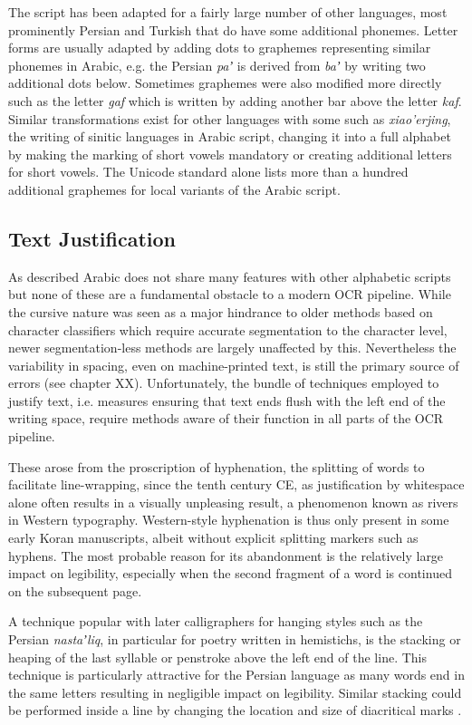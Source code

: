The script has been adapted for a fairly large number of other languages, most
prominently Persian and Turkish that do have some additional phonemes. Letter
forms are usually adapted by adding dots to graphemes representing similar
phonemes in Arabic, e.g. the Persian \emph{paʼ} is derived from \emph{baʼ} by
writing two additional dots below. Sometimes graphemes were also modified more
directly such as the letter \emph{gaf} which is written by adding another bar
above the letter \emph{kaf}. Similar transformations exist for other languages
with some such as \emph{xiao'erjing}, the writing of sinitic languages in
Arabic script, changing it into a full alphabet by making the marking of short
vowels mandatory or creating additional letters for short vowels. The Unicode
standard alone lists more than a hundred additional graphemes for local
variants of the Arabic script.

\subsection{Text Justification}

As described Arabic does not share many features with other alphabetic scripts
but none of these are a fundamental obstacle to a modern OCR pipeline.  While
the cursive nature was seen as a major hindrance to older methods based on
character classifiers which require accurate segmentation to the character
level, newer segmentation-less methods are largely unaffected by this.
Nevertheless the variability in spacing, even on machine-printed text, is still
the primary source of errors (see chapter XX). Unfortunately, the
bundle of techniques employed to justify text, i.e. measures ensuring that text
ends flush with the left end of the writing space, require methods aware of
their function in all parts of the OCR pipeline.

These arose from the proscription of hyphenation, the splitting of words to
facilitate line-wrapping, since the tenth century CE, as justification by
whitespace alone often results in a visually unpleasing result, a phenomenon
known as rivers in Western typography. Western-style hyphenation is thus only
present in some early Koran manuscripts, albeit without explicit splitting
markers such as hyphens. The most probable reason for its abandonment is the
relatively large impact on legibility, especially when the second fragment of a
word is continued on the subsequent page.

A technique popular with later calligraphers for hanging styles such as the
Persian \emph{nastaʼliq}, in particular for poetry written in hemistichs, is
the stacking or heaping of the last syllable or penstroke above the left end of
the line. This technique is particularly attractive for the Persian language
as many words end in the same letters resulting in negligible impact on
legibility. Similar stacking could be performed inside a line by changing the
location and size of diacritical marks \cite[pg. 14]{blair2006islamic}.

